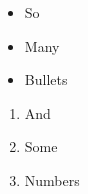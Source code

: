 \documentclass{article}
\begin{document}
\begin{itemize}
  \item So
  \item Many
  \item Bullets
\end{itemize}

\begin{enumerate}
  \item And
  \item Some
  \item Numbers
\end{enumerate}
\end{document}
